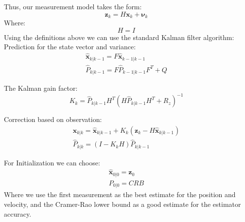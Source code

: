 Thus, our measurement model takes the form:
\begin{equation}
\mathbf{z}_{k} = H \mathbf{x}_{k}+ \mathbf{\nu}_{k}
\end{equation}
Where:
\begin{equation}
H=I
\end{equation}
Using the definitions above we can use the standard Kalman filter algorithm:
\\

Prediction for the state vector and variance:
\begin{eqnarray}
\mathbf{\hat{x}}_{{k|k-1}} = F \mathbf{\hat{x}}_{{k-1|k-1}}\\
\hat{P}_{k|k-1} = F \hat{P}_{k-1|k-1}F^T+Q
\end{eqnarray}

The Kalman gain factor:
\begin{equation}
K_k = \hat{P}_{k|k-1} H^T(H\hat{P}_{k|k-1}H^T+R_z)^{-1}
\end{equation}

Correction based on observation:
\begin{eqnarray}
\mathbf{\hat{x}}_{{k|k}} = \mathbf{\hat{x}}_{{k|k-1}} +K_k(\mathbf{z}_k-H\mathbf{\hat{x}}_{{k|k-1}})\\
\hat{P}_{k|k} = (I-K_kH)\hat{P}_{k|k-1}
\end{eqnarray}

For Initialization we can choose:
\begin{eqnarray*}
\mathbf{\hat{x}}_{0|0}=\mathbf{z}_0\\
P_{0|0} = CRB
\end{eqnarray*}
Where we use the first measurement as the best estimate for the position and velocity, and the Cramer-Rao lower bound as a good estimate for the estimator accuracy.
